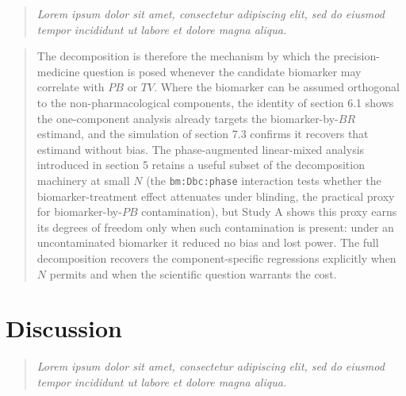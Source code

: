 \documentclass[
  11pt,
]{article}
\newenvironment{rgt}{%
  \begin{quote}\small\itshape\color[RGB]{20,60,160}}{%
  \end{quote}}
\newenvironment{orig}{%
  \begin{quote}\normalsize\color[gray]{0.55}}{%
  \end{quote}}
\begin{document}
\begin{rgt}
Lorem ipsum dolor sit amet, consectetur adipiscing elit, sed do eiusmod tempor incididunt ut labore et dolore magna aliqua.

\end{rgt}

\begin{orig}
The decomposition is therefore the mechanism by which the
precision-medicine question is posed whenever the candidate
biomarker may correlate with \(PB\) or \(TV\). Where the biomarker can
be assumed orthogonal to the non-pharmacological components, the
identity of section 6.1 shows the one-component analysis already targets
the biomarker-by-\(BR\) estimand, and the simulation of section 7.3
confirms it recovers that estimand without bias. The phase-augmented
linear-mixed analysis introduced in section 5 retains a useful
subset of the decomposition machinery at small \(N\) (the
\texttt{bm:Dbc:phase} interaction tests whether the
biomarker-treatment effect attenuates under blinding, the
practical proxy for biomarker-by-\(PB\) contamination), but Study A
shows this proxy earns its degrees of freedom only when such
contamination is present: under an uncontaminated biomarker it
reduced no bias and lost power. The full decomposition recovers the
component-specific regressions explicitly when \(N\) permits and when
the scientific question warrants the cost.

\end{orig}

\section{Discussion}\label{discussion}

\begin{rgt}
Lorem ipsum dolor sit amet, consectetur adipiscing elit, sed do eiusmod tempor incididunt ut labore et dolore magna aliqua.

\end{rgt}
\end{document}
